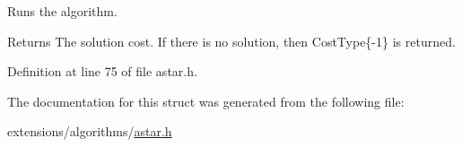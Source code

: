 Runs the algorithm. 

\begin{DoxyReturn}{Returns}
The solution cost. If there is no solution, then {\ttfamily Cost\+Type\{-\/1\}} is returned. 
\end{DoxyReturn}


Definition at line 75 of file astar.\+h.



The documentation for this struct was generated from the following file\+:\begin{DoxyCompactItemize}
\item 
extensions/algorithms/\hyperlink{astar_8h}{astar.\+h}\end{DoxyCompactItemize}
